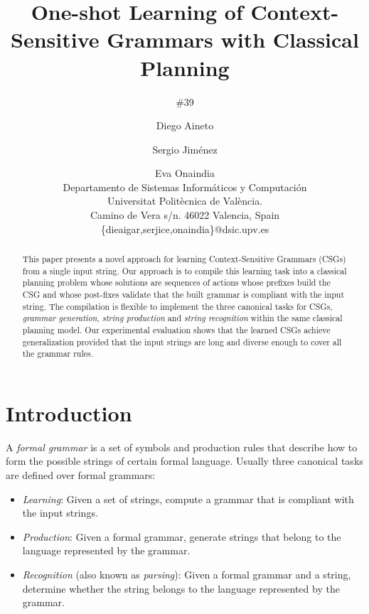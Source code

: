 \documentclass[letterpaper]{article} %
\begin{document}
\title{One-shot Learning of Context-Sensitive Grammars with Classical Planning}
\author{\#39}


\author{Diego Aineto\and Sergio Jim\'enez\and Eva Onaindia\\
{\small Departamento de Sistemas Inform\'aticos y Computaci\'on}\\
{\small Universitat Polit\`ecnica de Val\`encia.}\\
{\small Camino de Vera s/n. 46022 Valencia, Spain}\\
{\small \{dieaigar,serjice,onaindia\}@dsic.upv.es}}

\maketitle
\begin{abstract}
This paper presents a novel approach for learning Context-Sensitive Grammars (CSGs) from a single input string. Our approach is to compile this learning task into a classical planning problem whose solutions are sequences of actions whose prefixes build the CSG and whose post-fixes validate that the built grammar is compliant with the input string. The compilation is flexible to implement the three canonical tasks for CSGs, {\it grammar generation}, {\it string production} and {\it string recognition} within the same classical planning model. Our experimental evaluation shows that the learned CSGs achieve generalization provided that the input strings are long and diverse enough to cover all the grammar rules.  
\end{abstract}


\section{Introduction}
\label{sec:section1}
A {\em formal grammar} is a set of symbols and production rules that describe how to form the possible strings of certain formal language. Usually three canonical tasks are defined over formal grammars:
\begin{itemize}
\item {\it Learning}: Given a set of strings, compute a grammar that is compliant with the input strings.
\item {\it Production}: Given a formal grammar, generate strings that belong to the language represented by the grammar.
\item {\it Recognition} (also known as {\em parsing}): Given a formal grammar and a string, determine whether the string belongs to the language represented by the grammar.
\end{itemize}
\end{document}
